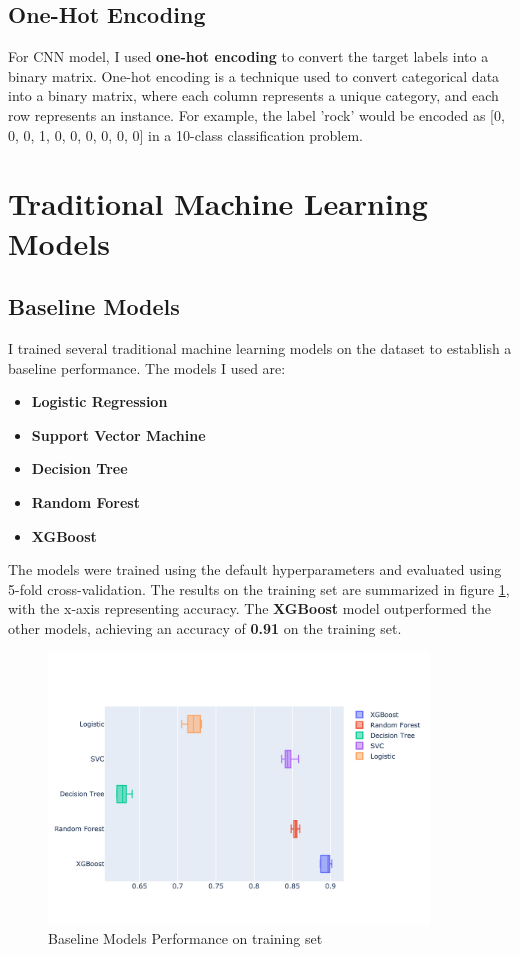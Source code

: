 \documentclass[11.5pt]{article}
\begin{document}
\subsection{One-Hot Encoding}
For CNN model, I used \textbf{one-hot encoding} to convert the target labels into a binary matrix. One-hot encoding is a technique used to convert categorical data into a binary matrix, where each column represents a unique category, and each row represents an instance. For example, the label 'rock' would be encoded as [0, 0, 0, 1, 0, 0, 0, 0, 0, 0] in a 10-class classification problem.

\pagebreak
\section{Traditional Machine Learning Models} \label{sec:traditional_ml}
\subsection{Baseline Models}
I trained several traditional machine learning models on the dataset to establish a baseline performance. The models I used are:
\begin{itemize}
    \item \textbf{Logistic Regression}
    \item \textbf{Support Vector Machine}
    \item \textbf{Decision Tree}
    \item \textbf{Random Forest}
    \item \textbf{XGBoost}
\end{itemize}
The models were trained using the default hyperparameters and evaluated using 5-fold cross-validation. The results on the training set are summarized in figure \ref{fig:baseline_models}, with the x-axis representing accuracy. The \textbf{XGBoost} model outperformed the other models, achieving an accuracy of \textbf{0.91} on the training set.
\begin{figure}[H]
    \centering
    \includegraphics[width=0.9\textwidth]{graphics/baseline_models.jpg}
    \caption{Baseline Models Performance on training set}
    \label{fig:baseline_models}
\end{figure}
\end{document}
